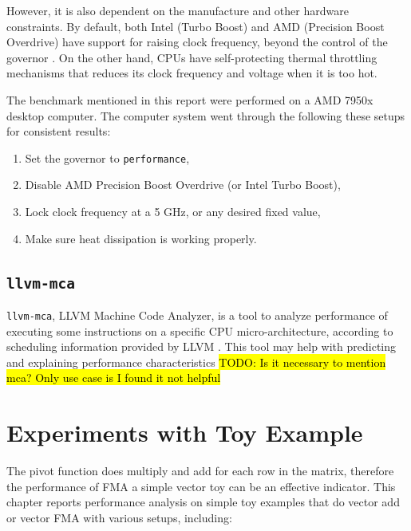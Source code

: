 \documentclass[logo,bsc,singlespacing,parskip]{infthesis}
\newenvironment{compactlist}
{ \begin{enumerate}
    \setlength{\itemsep}{0pt}
    \setlength{\parskip}{0pt}
    \setlength{\parsep}{0pt}     
}
{ \end{enumerate} }
\begin{document}
However, it is also dependent on the manufacture and other hardware constraints.
By default, both Intel (Turbo Boost) and AMD (Precision Boost Overdrive) have
support for raising clock frequency, beyond the control of the governor
\cite{GoogleBenchReduceVariance}. On the other hand, CPUs have self-protecting
thermal throttling mechanisms that reduces its clock frequency and voltage when
it is too hot. 

The benchmark mentioned in this report were performed on a AMD 7950x desktop
computer. The computer system went through the following these setups for
consistent results:
\begin{compactlist}
    \item Set the governor to \texttt{performance}, 
    \item Disable AMD Precision Boost Overdrive (or Intel Turbo Boost), 
    \item Lock clock frequency at a 5 GHz, or any desired fixed value,
    \item Make sure heat dissipation is working properly.
\end{compactlist}



\section{\texttt{llvm-mca}}

\texttt{llvm-mca}, LLVM Machine Code Analyzer, is a tool to analyze performance of
executing some instructions on a specific CPU micro-architecture, according to
scheduling information provided by LLVM \cite{llvm-mca}. This tool may help with predicting and
explaining performance characteristics \hl{TODO: Is it necessary to mention mca?
Only use case is I found it not helpful}


\chapter{Experiments with Toy Example}
\label{sec:Toy}

The pivot function does multiply and add for each row in the matrix, therefore
the performance of FMA a simple vector toy can be an effective indicator. This
chapter reports performance analysis on simple toy examples that do vector add
or vector FMA with various setups, including: 
\end{document}
